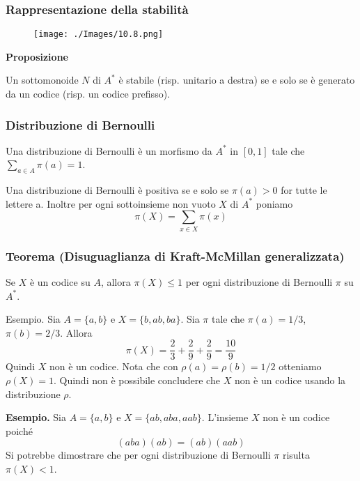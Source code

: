\subsubsection{Rappresentazione della stabilità}

\begin{figure}[hbpt!]
    \centering
    \texttt{[image: ./Images/10.8.png]}
\end{figure}
\FloatBarrier

\textbf{Proposizione}

Un sottomonoide $N$ di $A^{*}$ è stabile (risp. unitario a destra) se e solo se è generato da un codice (risp. un codice prefisso).

\subsubsection{Distribuzione di Bernoulli}

Una distribuzione di Bernoulli è un morfismo da $A^{*}$ in $[0,1]$ tale che $\sum_{a \in A} \pi(a)=1$.

Una distribuzione di Bernoulli è positiva se e solo se $\pi(a)>0$ for tutte le lettere a.
Inoltre per ogni sottoinsieme non vuoto $X$ di $A^{*}$ poniamo
$$
\pi(X)=\sum_{x \in X} \pi(x)
$$

\subsubsection{Teorema (Disuguaglianza di Kraft-McMillan generalizzata) }

Se $X$ è un codice su $A$, allora $\pi(X) \leq 1$ per ogni distribuzione di Bernoulli $\pi$ su $A^{*}$.


Esempio.
Sia $A=\{a, b\}$ e $X=\{b, a b, b a\} .$ Sia $\pi$ tale che $\pi(a)=1 / 3$, $\pi(b)=2 / 3$. Allora
$$
\pi(X)=\frac{2}{3}+\frac{2}{9}+\frac{2}{9}=\frac{10}{9}
$$
Quindi $X$ non è un codice. Nota che con $\rho(a)=\rho(b)=1 / 2$ otteniamo $\rho(X)=1$. Quindi non è possibile concludere che $X$ non è un codice usando la distribuzione $\rho$.

\vspace{5mm}

\textbf{Esempio.}
Sia $A=\{a, b\}$ e $X=\{a b, a b a, a a b\}$. L'insieme $X$ non è un codice poiché
$$
(a b a)(a b)=(a b)(a a b)
$$
Si potrebbe dimostrare che per ogni distribuzione di Bernoulli $\pi$ risulta $\pi(X)<1$.

\vspace{5mm}

